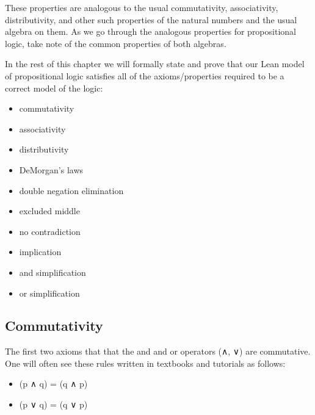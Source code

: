 \documentclass[letterpaper,10pt,english]{sphinxmanual}
\begin{document}
\sphinxAtStartPar
These properties are analogous to the usual commutativity,
associativity, distributivity, and other such properties of
the natural numbers and the usual algebra on them. As we go
through the analogous properties for propositional logic,
take note of the common properties of both algebras.

\sphinxAtStartPar
In the rest of this chapter we will formally state and
prove that our Lean model of propositional logic satisfies
all of the axioms/properties required to be a correct model
of the logic:
\begin{itemize}
\item {} 
\sphinxAtStartPar
commutativity

\item {} 
\sphinxAtStartPar
associativity

\item {} 
\sphinxAtStartPar
distributivity

\item {} 
\sphinxAtStartPar
DeMorgan’s laws

\item {} 
\sphinxAtStartPar
double negation elimination

\item {} 
\sphinxAtStartPar
excluded middle

\item {} 
\sphinxAtStartPar
no contradiction

\item {} 
\sphinxAtStartPar
implication

\item {} 
\sphinxAtStartPar
and simplification

\item {} 
\sphinxAtStartPar
or simplification

\end{itemize}


\subsection{Commutativity}
\label{\detokenize{A_01_Propositional_Logic:commutativity}}
\sphinxAtStartPar
The first two axioms that that the and and or operators
(∧, ∨) are commutative. One will often see these rules
written in textbooks and tutorials as follows:
\begin{itemize}
\item {} 
\sphinxAtStartPar
(p ∧ q) = (q ∧ p)

\item {} 
\sphinxAtStartPar
(p ∨ q) = (q ∨ p)

\end{itemize}
\end{document}
